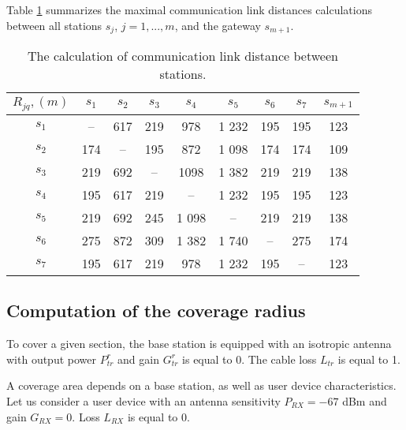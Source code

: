 Table \ref{tab:Rjq} summarizes the maximal communication link distances calculations between all stations $ s_j $, $ j = 1, ..., m $, and the gateway $ s_ {m + 1} $.

\begin{table}[h!]\begin{center}
  \begin{tabular}{|c||c|c|c|c|c|c|c|c|}\hline
      $R_{jq}, (m)$ & $s_1$ & $s_2$ & $s_3$ & $s_4$ & $s_5$ & $s_6$ & $s_7$ & $s_{m+1}$ \\ \hline \hline

      $s_1$ & -- & 617 & 219 & 978 & 1 232 & 195 & 195 & 123 \\ 

      $s_2$ & 174 & -- & 195 & 872 & 1 098 & 174 & 174 & 109 \\

      $s_3$ & 219 & 692 & -- & 1098 & 1 382 & 219 & 219 & 138 \\

      $s_4$ & 195 & 617 & 219 & -- & 1 232 & 195 & 195 & 123 \\

      $s_5$ & 219 & 692 & 245 & 1 098  &  -- & 219 & 219 & 138 \\

      $s_6$ & 275 & 872 & 309 & 1 382 &  1 740 & -- & 275 & 174 \\

      $s_7$ & 195 & 617 & 219 & 978 & 1 232 & 195 & -- & 123 \\ \hline

\end{tabular}\caption{The calculation of communication link distance between stations.}\label{tab:Rjq}
\end{center}\end{table}


\subsection{Computation of the coverage radius}

To cover a given section, the base station is equipped with an isotropic antenna with output power $ P_ {tr} ^ r $ and gain $ G_ {tr} ^ r $ is equal to 0. The cable loss $ L_ {tr} $ is equal to 1.

A coverage area depends on a base station, as well as user device characteristics. Let us consider a user device with an antenna sensitivity $P_{RX} = -67$ dBm and gain $G_{RX} = 0$. Loss $L_{RX}$ is equal to 0.

